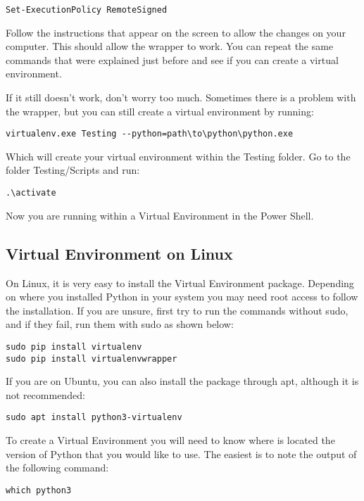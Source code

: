 \begin{verbatim}
Set-ExecutionPolicy RemoteSigned
\end{verbatim}

Follow the instructions that appear on the screen to allow the changes on your computer. This should allow the wrapper to work. You can repeat the same commands that were explained just before and see if you can create a virtual environment.

If it still doesn’t work, don’t worry too much. Sometimes there is a problem with the wrapper, but you can still create a virtual environment by running:
\begin{verbatim}
virtualenv.exe Testing --python=path\to\python\python.exe
\end{verbatim}

Which will create your virtual environment within the Testing folder. Go to the folder Testing/Scripts and run:
\begin{verbatim}
.\activate
\end{verbatim}

Now you are running within a Virtual Environment in the Power Shell.

\subsection{Virtual Environment on Linux}
On Linux, it is very easy to install the Virtual Environment package. Depending on where you installed Python in your system you may need root access to follow the installation. If you are unsure, first try to run the commands without sudo, and if they fail, run them with sudo as shown below:

\begin{verbatim}
sudo pip install virtualenv
sudo pip install virtualenvwrapper
\end{verbatim}

If you are on Ubuntu, you can also install the package through apt, although it is not recommended:
\begin{verbatim}
sudo apt install python3-virtualenv
\end{verbatim}

To create a Virtual Environment you will need to know where is located the version of Python that you would like to use. The easiest is to note the output of the following command:

\begin{verbatim}
which python3
\end{verbatim}

